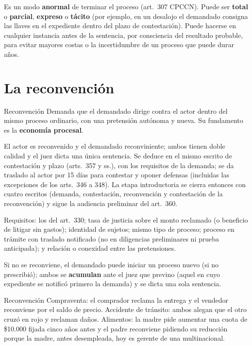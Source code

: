 \documentclass[12pt,oneside]{book}
\begin{document}
Es un modo \textbf{anormal} de terminar el proceso (art.~307 CPCCN). Puede ser \textbf{total} o \textbf{parcial}, \textbf{expreso} o \textbf{tácito} (por ejemplo, en un desalojo el demandado consigna las llaves en el expediente dentro del plazo de contestación). Puede hacerse en cualquier instancia antes de la sentencia, por consciencia del resultado probable, para evitar mayores costas o la incertidumbre de un proceso que puede durar años.

\section{La reconvención}

\begin{definicion}{Reconvención}
Demanda que el demandado dirige contra el actor dentro del mismo proceso ordinario, con una pretensión autónoma y nueva. Su fundamento es la \textbf{economía procesal}.
\end{definicion}

El actor es reconvenido y el demandado reconviniente; ambos tienen doble calidad y el juez dicta una única sentencia. Se deduce en el mismo escrito de contestación y plazo (arts.~357 y ss.), con los requisitos de la demanda; se da traslado al actor por 15 días para contestar y oponer defensas (incluidas las excepciones de los arts.~346 a 348). La etapa introductoria se cierra entonces con cuatro escritos (demanda, contestación, reconvención y contestación de la reconvención) y sigue la audiencia preliminar del art.~360.

Requisitos: los del art.~330; tasa de justicia sobre el monto reclamado (o beneficio de litigar sin gastos); identidad de sujetos; mismo tipo de proceso; proceso en trámite con traslado notificado (no en diligencias preliminares ni prueba anticipada); y relación o conexidad entre las pretensiones.

Si no se reconviene, el demandado puede iniciar un proceso nuevo (si no prescribió); ambos se \textbf{acumulan} ante el juez que previno (aquel en cuyo expediente se notificó primero la demanda) y se dicta una sola sentencia.

\begin{ejemplo}{Reconvención}
Compraventa: el comprador reclama la entrega y el vendedor reconviene por el saldo de precio. Accidente de tránsito: ambos alegan que el otro cruzó en rojo y reclaman daños. Alimentos: la madre pide aumentar una cuota de \$10.000 fijada cinco años antes y el padre reconviene pidiendo su reducción porque la madre, antes desempleada, hoy es gerente de una multinacional.
\end{ejemplo}
\end{document}
